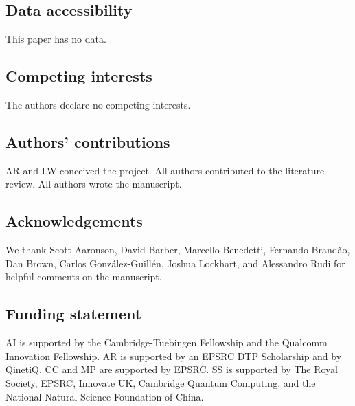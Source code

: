 \documentclass[a4paper, 11pt]{article}
\begin{document}
\subsection*{Data accessibility}

This paper has no data.

\subsection*{Competing interests}

The authors declare no competing interests.

\subsection*{Authors' contributions}

AR and LW conceived the project. All authors contributed to the literature review. All authors wrote the manuscript. 

\subsection*{Acknowledgements}

We thank Scott Aaronson, David Barber, Marcello Benedetti, Fernando Brand\~{a}o, Dan Brown, Carlos Gonz\'alez-Guill\'en, Joshua Lockhart, and Alessandro Rudi for helpful comments on the manuscript. 

\subsection*{Funding statement}

AI is supported by the Cambridge-Tuebingen Fellowship and the Qualcomm Innovation Fellowship. AR is supported by an EPSRC DTP Scholarship and by QinetiQ. CC and MP are supported by EPSRC. SS is supported by The Royal Society, EPSRC, Innovate UK, Cambridge Quantum Computing, and the National Natural Science Foundation of China. 

\printbibliography
\end{document}
